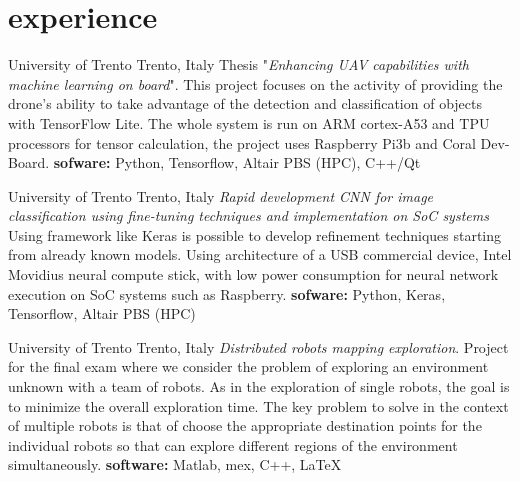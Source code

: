 \documentclass[a4,oneside]{friggeri-cv} %
\begin{document}
\section{experience}
  \begin{entrylist}
    {University of Trento}
    {Trento, Italy}
    {Thesis "\emph{Enhancing UAV capabilities with machine learning on board}".}
    {This project focuses on the activity of providing the drone's ability to
take advantage of the detection and classification of objects with TensorFlow
Lite. The whole system is run on ARM cortex-A53 and TPU processors for tensor
calculation, the project uses Raspberry Pi3b and Coral Dev-Board.}
    {\textbf{sofware:} Python, Tensorflow, Altair PBS (HPC), C++/Qt} 
    {\href{https://github.com/frank1789/MasterThesis}{\faGithub}}
    

    {University of Trento}
    {Trento, Italy}
    {\emph{Rapid development CNN for image classification using fine-tuning
techniques and implementation on SoC systems}}
    {Using framework like Keras is possible to develop refinement techniques
starting from already known models. Using architecture of a USB commercial
device, Intel Movidius neural compute stick, with low power consumption for
neural network execution on SoC systems such as Raspberry.}
    {\textbf{sofware:} Python, Keras, Tensorflow, Altair PBS (HPC)}
    {\href{https://github.com/frank1789/NeuralNetworks}{\faGithub}}
      

    {University of Trento}
    {Trento, Italy}
    {\emph{Distributed robots mapping exploration}.}
    {Project for the final exam where we consider the problem of exploring an
environment unknown with a team of robots. As in the exploration of single
robots, the goal is to minimize the overall exploration time. The key problem to
solve in the context of multiple robots is that of choose the appropriate
destination points for the individual robots so that can explore different
regions of the environment simultaneously.}
    {\textbf{software: } Matlab, mex, C++, \LaTeX}
    {\href{https://github.com/frank1789/DistributedSystemProject}{\faGithub}}
      
\end{entrylist}
\end{document}
